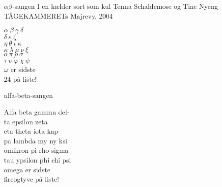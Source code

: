 \begin{song}{$\alpha\beta$-sangen}{}
  {I en kælder sort som kul}
  {Tenna Schaldemose og Tine Nyeng}
  {TÅGEKAMMERETs Majrevy, 2004}
  {\NotCCLIed}

  \begin{SBVerse}
    $\alpha\ \beta\ \gamma\ \delta$\hspace{-2.5pt}\protect\colorbox{white}{\phantom{$\delta$}}\\
    \hspace{-2.5pt}$\delta$\hspace{-1.25em}\colorbox{white}{\phantom{$\delta$}}$\ \varepsilon\ \zeta$\\
    $\eta\ \theta\ \iota\ \kappa$\hspace{-2.5pt}\protect\colorbox{white}{\phantom{$\kappa$}}\\
    \hspace{-3pt}$\kappa$\hspace{-1.3em}\colorbox{white}{\phantom{$\kappa$}}$\ \lambda\ \mu\ \nu\ \xi$\\
    $o\ \pi\ \rho\ \sigma$\\
    $\tau\ \upsilon\ \varphi\ \chi\ \psi$\\
    $\omega$ er sidste\\
    $24$ på liste!
  \end{SBVerse}
\CBPageBrk
  \begin{xlatn}{alfa-beta-sangen}
    {}
    {}

    \begin{SBVerse}
      Alfa beta gamma del-\\
      ta epsilon zeta\\
      eta theta iota kap-\\
      pa lambda my ny ksi\\
      omikron pi rho sigma\\
      tau ypsilon phi chi psi\\
      omega er sidste\\
      fireogtyve på liste!
    \end{SBVerse}
  \end{xlatn}
\end{song}